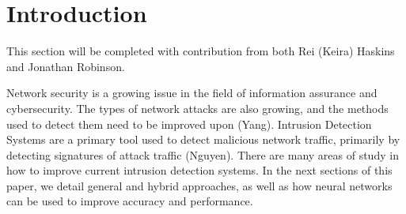 \section{Introduction}
This section will be completed with contribution from both Rei (Keira) Haskins and Jonathan Robinson.

Network security is a growing issue in the field of information assurance and cybersecurity. The types of network attacks are also growing, and the methods used to 
detect them need to be improved upon (Yang). Intrusion Detection Systems are a primary tool used to detect malicious network traffic, primarily by detecting 
signatures of attack traffic (Nguyen). There are many areas of study in how to improve current intrusion detection systems. In the next sections of this paper, we 
detail general and hybrid approaches, as well as how neural networks can be used to improve accuracy and performance. 

%

